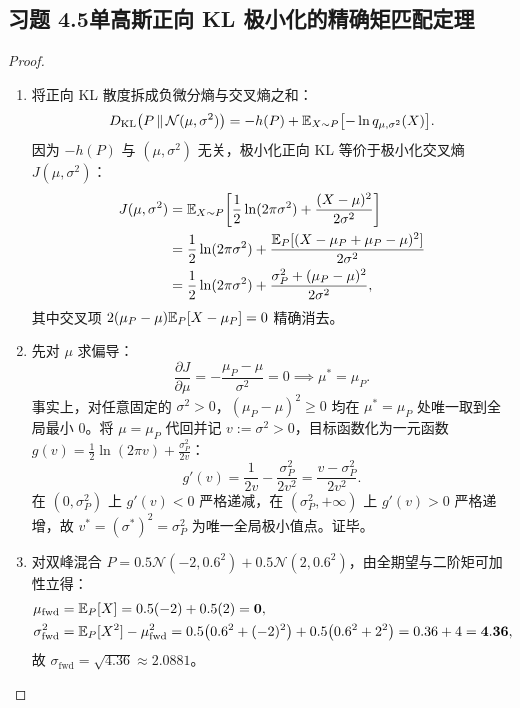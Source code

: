 \subsection*{习题 4.5\quad 单高斯正向 KL 极小化的精确矩匹配定理}
\begin{proof}
\begin{enumerate}[label=(\arabic*), leftmargin=1.8em]
  \item 将正向 KL 散度拆成负微分熵与交叉熵之和：
  \[
    D_{\mathrm{KL}}\bigl(P \,\|\, \mathcal{N}(\mu, \sigma^2)\bigr)
    = -h(P) + \mathbb{E}_{X\sim P}\bigl[-\ln q_{\mu,\sigma^2}(X)\bigr].
  \]
  因为 $-h(P)$ 与 $(\mu, \sigma^2)$ 无关，极小化正向 KL 等价于极小化交叉熵 $J(\mu, \sigma^2)$：
  \begin{align*}
    J(\mu, \sigma^2)
    &= \mathbb{E}_{X\sim P}\!\left[\frac{1}{2}\ln(2\pi\sigma^2) + \frac{(X - \mu)^2}{2\sigma^2}\right] \\
    &= \frac{1}{2}\ln(2\pi\sigma^2) + \frac{\mathbb{E}_P[(X - \mu_P + \mu_P - \mu)^2]}{2\sigma^2} \\
    &= \frac{1}{2}\ln(2\pi\sigma^2) + \frac{\sigma_P^2 + (\mu_P - \mu)^2}{2\sigma^2},
  \end{align*}
  其中交叉项 $2(\mu_P - \mu)\mathbb{E}_P[X - \mu_P] = 0$ 精确消去。
  \item 先对 $\mu$ 求偏导：
  \[
    \frac{\partial J}{\partial \mu} = -\frac{\mu_P - \mu}{\sigma^2} = 0 \implies \mu^* = \mu_P.
  \]
  事实上，对任意固定的 $\sigma^2 > 0$，$(\mu_P - \mu)^2 \ge 0$ 均在 $\mu^* = \mu_P$ 处唯一取到全局最小 $0$。将 $\mu = \mu_P$ 代回并记 $v := \sigma^2 > 0$，目标函数化为一元函数 $g(v) = \frac{1}{2}\ln(2\pi v) + \frac{\sigma_P^2}{2v}$：
  \[
    g'(v) = \frac{1}{2v} - \frac{\sigma_P^2}{2v^2} = \frac{v - \sigma_P^2}{2v^2}.
  \]
  在 $(0, \sigma_P^2)$ 上 $g'(v) < 0$ 严格递减，在 $(\sigma_P^2, +\infty)$ 上 $g'(v) > 0$ 严格递增，故 $v^* = (\sigma^*)^2 = \sigma_P^2$ 为唯一全局极小值点。证毕。
  \item 对双峰混合 $P = 0.5\mathcal{N}(-2, 0.6^2) + 0.5\mathcal{N}(2, 0.6^2)$，由全期望与二阶矩可加性立得：
  \begin{align*}
    \mu_{\mathrm{fwd}} &= \mathbb{E}_P[X] = 0.5(-2) + 0.5(2) = \mathbf{0}, \\
    \sigma_{\mathrm{fwd}}^2 &= \mathbb{E}_P[X^2] - \mu_{\mathrm{fwd}}^2
     = 0.5\bigl(0.6^2 + (-2)^2\bigr) + 0.5\bigl(0.6^2 + 2^2\bigr) = 0.36 + 4 = \mathbf{4.36},
  \end{align*}
  故 $\sigma_{\mathrm{fwd}} = \sqrt{4.36} \approx \mathbf{2.0881}$。
\end{enumerate}
\end{proof}

